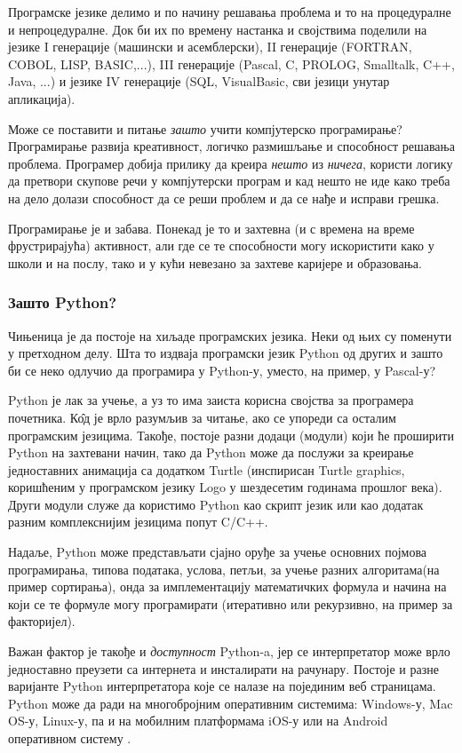 Програмске језике делимо и по начину решавања проблема и то на процедуралне и непроцедуралне. Док би их по времену настанка и својствима поделили на језике I генерације (машински и асемблерски), II генерације (FORTRAN, COBOL, LISP, BASIC,...), III генерације (Pascal, C, PROLOG, Smalltalk, C++, Java, ...) и језике IV генерације (SQL, VisualBasic, сви језици унутар апликација).\cite{tosic}

Може се поставити и питање \emph{зашто} учити компјутерско програмирање? Програмирање развија креативност, логичко размишљање и способност решавања проблема. Програмер добија прилику да креира \emph{нешто} из \emph{ничега}, користи логику да претвори скупове речи у компјутерски програм и кад нешто не иде како треба на дело долази способност да се реши проблем и да се нађе и исправи грешка.

Програмирање је и забава. Понекад је то и захтевна (и с времена на време фрустрирајућа) активност, али где се те способности могу искористити како у школи и на послу, тако и у кући невезано за захтеве каријере и образовања.

\subsubsection{Зашто Python?}
Чињеница је да постоје на хиљаде програмских језика. Неки од њих су поменути у претходном делу. Шта то издваја програмски језик Python од других и зашто би се неко одлучио да програмира у Python-у, уместо, на пример, у Pascal-у?

Python је лак за учење, а уз то има заиста корисна својства за програмера почетника. К\^{о}д је врло разумљив за читање, ако се упореди са осталим програмским језицима. Такође, постоје разни додаци (модули) који ће проширити Python на захтевани начин, тако да Python може да послужи за креирање једноставних анимација са додатком Turtle (инспирисан Turtle graphics, коришћеним у програмском језику Logo у шездесетим годинама прошлог века)\cite{briggs2012python}. Други модули служе да користимо Python као скрипт језик или као додатак разним комплекснијим језицима попут  C/C++.

Надаље, Python може представљати сјајно оруђе за учење основних појмова програмирања, типова података, услова, петљи, за учење разних алгоритама(на пример сортирања), онда за имплементацију математичких формула и начина на који се те формуле могу програмирати (итеративно или рекурзивно, на пример за факторијел).

Важан фактор је такође и \emph{доступност} Python-a, јер се интерпретатор може врло једноставно преузети са интернета и инсталирати на рачунару. Постоје и разне варијанте Python интерпретатора које се налазе на појединим веб страницама. Python може да ради на многобројним оперативним системима: Windows-у, Mac OS-у, Linux-у, па и на мобилним платформама iOS-у или на Android оперативном систему\cite{pythonsite} .

